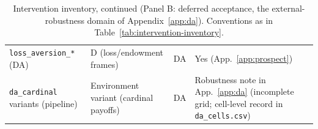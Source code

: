 \begin{table}[p]
\begin{tabular}{p{4.9cm} p{3.3cm} p{1.0cm} p{4.4cm}}
\texttt{loss\_aversion\_*} (DA) & D (loss/endowment frames) & DA & Yes (App.~\ref{app:prospect}) \\
\texttt{da\_cardinal} variants (pipeline) & Environment variant (cardinal payoffs) & DA & Robustness note in App.~\ref{app:da} (incomplete grid; cell-level record in \texttt{da\_cells.csv}) \\
\bottomrule
\end{tabular}
\caption{Intervention inventory, continued (Panel B: deferred acceptance, the external-robustness domain of Appendix~\ref{app:da}). Conventions as in Table~\ref{tab:intervention-inventory}.}
\label{tab:intervention-inventory-da}
\end{table}
